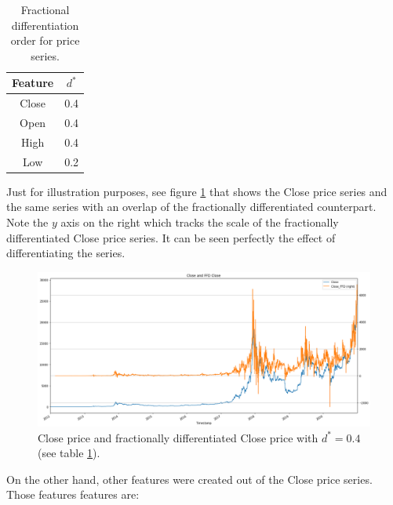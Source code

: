 \begin{table}[!htb]
  \begin{center}
    \begin{tabular}{ | c | c | }
      \hline
      Feature & $d^*$ \\
      \hline
      Close   & 0.4   \\  
      \hline
      Open    & 0.4   \\
      \hline
      High    & 0.4   \\
      \hline
      Low     & 0.2   \\    
      \hline
    \end{tabular}
    \caption{Fractional differentiation order for price series.}
    \label{table:frac_diff_prices}
  \end{center}
\end{table}

Just for illustration purposes, see figure \ref{fig:close_ffd} that shows the
Close price series and the same series with an overlap of the fractionally
differentiated counterpart. Note the $y$ axis on the right which tracks the
scale of the fractionally differentiated Close price series. It can be seen
perfectly the effect of differentiating the series.

\begin{figure}[!htb]
    \centering
    \includegraphics[width=\textwidth]{methods/images/btc_close_ffd.png}
    \caption{Close price and fractionally differentiated Close price with $d^* = 0.4$ (see table \ref{table:frac_diff_prices}).}
    \label{fig:close_ffd}
\end{figure}

On the other hand, other features were created out of the Close price series.
Those features features are:

